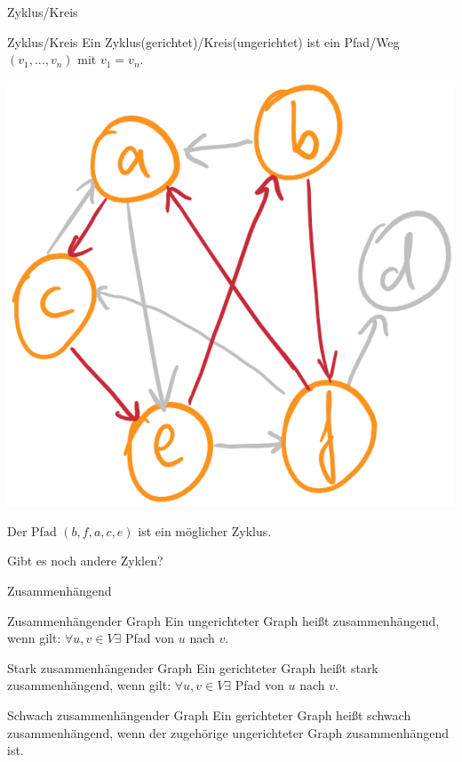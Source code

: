 \documentclass[handout]{beamer}
\begin{document}
\begin{frame}{Zyklus/Kreis}
	\begin{block}{Zyklus/Kreis}
		\ip Ein Zyklus(gerichtet)/Kreis(ungerichtet) ist ein Pfad/Weg $(v_1, ..., v_n)$ mit $v_1 = v_n$.
	\end{block}
	\bp
	\includegraphics[scale=0.3]{images/graph_zyklus.png}
	
	\ip Der Pfad $(b,f,a,c,e)$ ist ein möglicher Zyklus.
	
	\ip Gibt es noch andere Zyklen?
\end{frame}

\begin{frame}{Zusammenhängend}


	\bp
	
	\begin{block}{Zusammenhängender Graph}
		Ein ungerichteter Graph heißt zusammenhängend, wenn gilt: $\forall u,v \in V \exists$ Pfad von $u$ nach $v$.
	\end{block}

	\bp

	\begin{block}{Stark zusammenhängender Graph}
		Ein gerichteter Graph heißt stark zusammenhängend, wenn gilt: $\forall u,v \in V \exists$ Pfad von $u$ nach $v$.
	\end{block}

	\bp
	
	\begin{block}{Schwach zusammenhängender Graph}
	Ein gerichteter Graph heißt schwach zusammenhängend, wenn der zugehörige ungerichteter Graph zusammenhängend ist.
	\end{block}
\end{frame}
\end{document}
